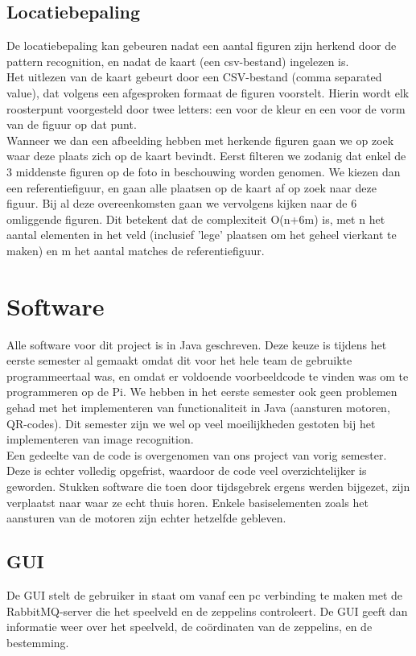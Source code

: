 \documentclass[tt]{penoverslag}
\begin{document}
\subsection{Locatiebepaling}
De locatiebepaling kan gebeuren nadat een aantal figuren zijn herkend door de pattern recognition, en nadat de kaart (een csv-bestand) ingelezen is. \\
Het uitlezen van de kaart gebeurt door een CSV-bestand (comma separated value), dat volgens een afgesproken formaat de figuren voorstelt. Hierin wordt elk roosterpunt voorgesteld door twee letters: een voor de kleur en een voor de vorm van de figuur op dat punt. \\
Wanneer we dan een afbeelding hebben met herkende figuren gaan we op zoek waar deze plaats zich op de kaart bevindt. Eerst filteren we zodanig dat enkel de 3 middenste figuren op de foto in beschouwing worden genomen. We kiezen dan een referentiefiguur, en gaan alle plaatsen op de kaart af op zoek naar deze figuur. Bij al deze overeenkomsten gaan we vervolgens kijken naar de 6 omliggende figuren. Dit betekent dat de complexiteit O(n+6m) is, met n het aantal elementen in het veld (inclusief 'lege' plaatsen om het geheel vierkant te maken) en m het aantal matches de referentiefiguur.

\section{Software}

Alle software voor dit project is in Java geschreven. Deze keuze is tijdens het eerste semester al gemaakt omdat dit voor het hele team de gebruikte programmeertaal was, en omdat er voldoende voorbeeldcode te vinden was om te programmeren op de Pi. We hebben in het eerste semester ook geen problemen gehad met het implementeren van functionaliteit in Java (aansturen motoren, QR-codes). Dit semester zijn we wel op veel moeilijkheden gestoten bij het implementeren van image recognition. \\

Een gedeelte van de code is overgenomen van ons project van vorig semester. Deze is echter volledig opgefrist, waardoor de code veel overzichtelijker is geworden. Stukken software die toen door tijdsgebrek ergens werden bijgezet, zijn verplaatst naar waar ze echt thuis horen. Enkele basiselementen zoals het aansturen van de motoren zijn echter hetzelfde gebleven.\\

\subsection{GUI}
De GUI stelt de gebruiker in staat om vanaf een pc verbinding te maken met de RabbitMQ-server die het speelveld en de zeppelins controleert. De GUI geeft dan informatie weer over het speelveld, de co\"{o}rdinaten van de zeppelins, en de bestemming. \\
\end{document}
